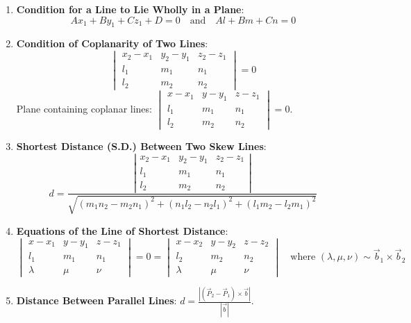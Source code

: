 \begin{theorembox}
\begin{enumerate}
    \item \textbf{Condition for a Line to Lie Wholly in a Plane}:
    \begin{equation}
        \boxed{Ax_1 + By_1 + Cz_1 + D = 0 \quad \text{and} \quad Al + Bm + Cn = 0}
    \end{equation}
    \item \textbf{Condition of Coplanarity of Two Lines}:
    \begin{equation}
        \boxed{\begin{vmatrix}
        x_2 - x_1 & y_2 - y_1 & z_2 - z_1 \\
        l_1 & m_1 & n_1 \\
        l_2 & m_2 & n_2
        \end{vmatrix} = 0}
    \end{equation}
    Plane containing coplanar lines: $\displaystyle \begin{vmatrix} x-x_1 & y-y_1 & z-z_1 \\ l_1 & m_1 & n_1 \\ l_2 & m_2 & n_2 \end{vmatrix} = 0$.
    \item \textbf{Shortest Distance (S.D.) Between Two Skew Lines}:
    \begin{equation}
        \boxed{d = \frac{\left|\begin{matrix}
        x_2 - x_1 & y_2 - y_1 & z_2 - z_1 \\
        l_1 & m_1 & n_1 \\
        l_2 & m_2 & n_2
        \end{matrix}\right|}{\sqrt{(m_1 n_2 - m_2 n_1)^2 + (n_1 l_2 - n_2 l_1)^2 + (l_1 m_2 - l_2 m_1)^2}}}
    \end{equation}
    \item \textbf{Equations of the Line of Shortest Distance}:
    \begin{equation}
        \boxed{\begin{vmatrix} x-x_1 & y-y_1 & z-z_1 \\ l_1 & m_1 & n_1 \\ \lambda & \mu & \nu \end{vmatrix} = 0 = \begin{vmatrix} x-x_2 & y-y_2 & z-z_2 \\ l_2 & m_2 & n_2 \\ \lambda & \mu & \nu \end{vmatrix}} \quad \text{where } (\lambda, \mu, \nu) \sim \vec{b}_1 \times \vec{b}_2
    \end{equation}
    \item \textbf{Distance Between Parallel Lines}: $\displaystyle \boxed{d = \frac{|(\vec{P}_2 - \vec{P}_1) \times \vec{b}|}{|\vec{b}|}}$.
\end{enumerate}
\end{theorembox}

